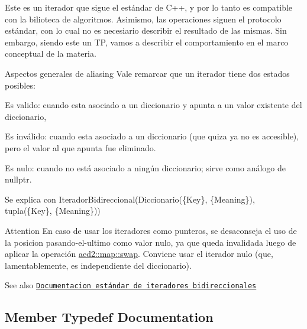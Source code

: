 Este es un iterador que sigue el estándar de C++, y por lo tanto es compatible con la bilioteca de algoritmos. Asimismo, las operaciones siguen el protocolo estándar, con lo cual no es necesiario describir el resultado de las mismas. Sin embargo, siendo este un TP, vamos a describir el comportamiento en el marco conceptual de la materia.

\begin{DoxyParagraph}{Aspectos generales de aliasing}
Vale remarcar que un iterador tiene dos estados posibles\+:
\begin{DoxyEnumerate}
\item Es valido\+: cuando esta asociado a un diccionario y apunta a un valor existente del diccionario,
\item Es inválido\+: cuando esta asociado a un diccionario (que quiza ya no es accesible), pero el valor al que apunta fue eliminado.
\item Es nulo\+: cuando no está asociado a ningún diccionario; sirve como análogo de {\ttfamily nullptr}. 
\end{DoxyEnumerate}
\end{DoxyParagraph}


\begin{DoxyParagraph}{Se explica con}
Iterador\+Bidireccional(Diccionario(\{Key\}, \{Meaning\}), tupla(\{Key\}, \{Meaning\}))
\end{DoxyParagraph}
\begin{DoxyAttention}{Attention}
En caso de usar los iteradores como punteros, se desaconseja el uso de la posicion pasando-\/el-\/ultimo como valor nulo, ya que queda invalidada luego de aplicar la operación \hyperlink{classaed2_1_1map_a43ddb71cc91e5c6021a7a1f243d6cc4a}{aed2\+::map\+::swap}. Conviene usar el iterador nulo (que, lamentablemente, es independiente del diccionario).
\end{DoxyAttention}
\begin{DoxySeeAlso}{See also}
\href{http://en.cppreference.com/w/cpp/concept/BidirectionalIterator}{\tt Documentacion estándar de iteradores bidireccionales} 
\end{DoxySeeAlso}


\subsection{Member Typedef Documentation}
\mbox{\label{classaed2_1_1iterator_a657402896e5b5966660032f5686cc4c4}} 

